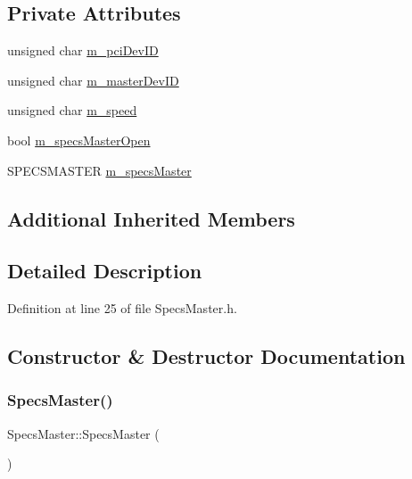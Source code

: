 \subsection*{Private Attributes}
\begin{DoxyCompactItemize}
\item 
unsigned char \hyperlink{classSpecsMaster_a1a2b2ea916633b7eaee63589946e8909}{m\+\_\+pci\+Dev\+ID}
\item 
unsigned char \hyperlink{classSpecsMaster_a46913a84dbe228a115ee1b90c82e44e2}{m\+\_\+master\+Dev\+ID}
\item 
unsigned char \hyperlink{classSpecsMaster_af75996281787299ccd92555512802814}{m\+\_\+speed}
\item 
bool \hyperlink{classSpecsMaster_aff461467e5aa5fdc853bfeecbd722db4}{m\+\_\+specs\+Master\+Open}
\item 
S\+P\+E\+C\+S\+M\+A\+S\+T\+ER \hyperlink{classSpecsMaster_a32497dbb9887b6c546113135f3acc6b1}{m\+\_\+specs\+Master}
\end{DoxyCompactItemize}
\subsection*{Additional Inherited Members}


\subsection{Detailed Description}


Definition at line 25 of file Specs\+Master.\+h.



\subsection{Constructor \& Destructor Documentation}
\mbox{\label{classSpecsMaster_a39e073d13593ceab986026816aa5a651}} 
\subsubsection{\texorpdfstring{Specs\+Master()}{SpecsMaster()}}
{\footnotesize\ttfamily Specs\+Master\+::\+Specs\+Master (\begin{DoxyParamCaption}{ }\end{DoxyParamCaption})}



